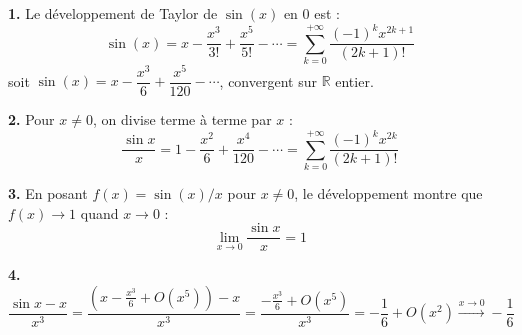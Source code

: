 \documentclass[12pt,a4paper]{article}
\begin{document}
\begin{boitecorrige}
\textbf{1.} Le développement de Taylor de $\sin(x)$ en $0$ est :
\[
\sin(x) = x - \frac{x^3}{3!} + \frac{x^5}{5!} - \cdots = \sum_{k=0}^{+\infty}\frac{(-1)^k x^{2k+1}}{(2k+1)!}
\]
soit $\sin(x) = x - \dfrac{x^3}{6} + \dfrac{x^5}{120} - \cdots$, convergent sur $\mathbb{R}$ entier.

\textbf{2.} Pour $x \neq 0$, on divise terme à terme par $x$ :
\[
\frac{\sin x}{x} = 1 - \frac{x^2}{6} + \frac{x^4}{120} - \cdots = \sum_{k=0}^{+\infty}\frac{(-1)^k x^{2k}}{(2k+1)!}
\]

\textbf{3.} En posant $f(x) = \sin(x)/x$ pour $x \neq 0$, le développement montre que $f(x) \to 1$ quand $x \to 0$ :
\[
\lim_{x\to 0}\frac{\sin x}{x} = 1
\]

\textbf{4.}
\[
\frac{\sin x - x}{x^3} = \frac{\left(x - \frac{x^3}{6} + O(x^5)\right) - x}{x^3} = \frac{-\frac{x^3}{6} + O(x^5)}{x^3} = -\frac{1}{6} + O(x^2) \xrightarrow{x\to 0} -\frac{1}{6}
\]
\end{boitecorrige}

\ifdefined\inMainDoc\else
\end{document}
